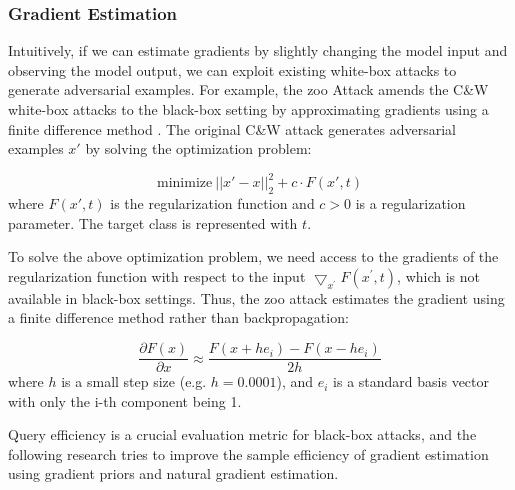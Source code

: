 
\subsubsection{Gradient Estimation}

Intuitively, if we can estimate gradients by slightly changing the model input and observing the model output, we can exploit existing white-box attacks to generate adversarial examples. For example, the \acrfull{zoo} Attack amends the C\&W white-box attacks to the black-box setting by approximating gradients using a finite difference method \citep{chen2017zoo}. The original C\&W attack generates adversarial examples $x'$ by solving the optimization problem:

\begin{equation}
    \text{minimize}\ ||x'-x||^2_2 + c \cdot F(x', t)
\end{equation}
where $F(x', t)$ is the regularization function and $c>0$ is a regularization parameter. The target class is represented with $t$.

To solve the above optimization problem, we need access to the gradients of the regularization function with respect to the input $\bigtriangledown_{x^{'}} F(x^{'}, t)$, which is not available in black-box settings. Thus, the \acrshort{zoo} attack estimates the gradient using a finite difference method rather than backpropagation:


\begin{equation}
    \frac{\partial F(x)}{\partial x} \approx \frac{F(x+he_i) - F(x-he_i)}{2h}
\end{equation}
where $h$ is a small step size (e.g. $h = 0.0001$), and $e_i$ is a standard basis vector with only the i-th component being 1.

Query efficiency is a crucial evaluation metric for black-box attacks, and the following research tries to improve the sample efficiency of gradient estimation using gradient priors and natural gradient estimation.


